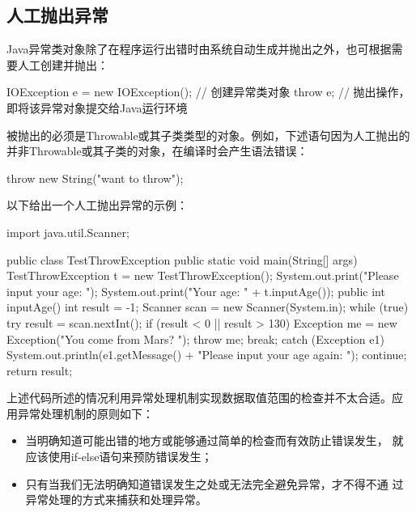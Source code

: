 \subsection{人工抛出异常}

Java异常类对象除了在程序运行出错时由系统自动生成并抛出之外，也可根据需
要人工创建并抛出：

\begin{javaCode}
IOException e = new IOException(); // 创建异常类对象
throw e; // 抛出操作，即将该异常对象提交给Java运行环境
\end{javaCode}

被抛出的必须是Throwable或其子类类型的对象。例如，下述语句因为人工抛出的
并非Throwable或其子类的对象，在编译时会产生语法错误：

\begin{javaCode}
throw new String("want to throw");  
\end{javaCode}

以下给出一个人工抛出异常的示例：


\begin{javaCode}
import java.util.Scanner;

public class TestThrowException {
  public static void main(String[] args) {
    TestThrowException t = new TestThrowException();
    System.out.print("Please input your age: ");
    System.out.print("Your age: " + t.inputAge());
  }
  public int inputAge() {
    int result = -1;
    Scanner scan = new Scanner(System.in);
    while (true) {
      try {
        result = scan.nextInt();
        if (result < 0 || result > 130) {
          Exception me = new Exception("You come from Mars? ");
          throw me;
        }
        break;
      } catch (Exception e1) {
        System.out.println(e1.getMessage() + "Please input your age again: ");
        continue;
      }
    }
    return result;
  }
}
\end{javaCode}

上述代码所述的情况利用异常处理机制实现数据取值范围的检查并不太合适。应
用异常处理机制的原则如下：

\begin{itemize}
\item 当明确知道可能出错的地方或能够通过简单的检查而有效防止错误发生，
  就应该使用if-else语句来预防错误发生；
\item 只有当我们无法明确知道错误发生之处或无法完全避免异常，才不得不通
  过异常处理的方式来捕获和处理异常。
\end{itemize}


